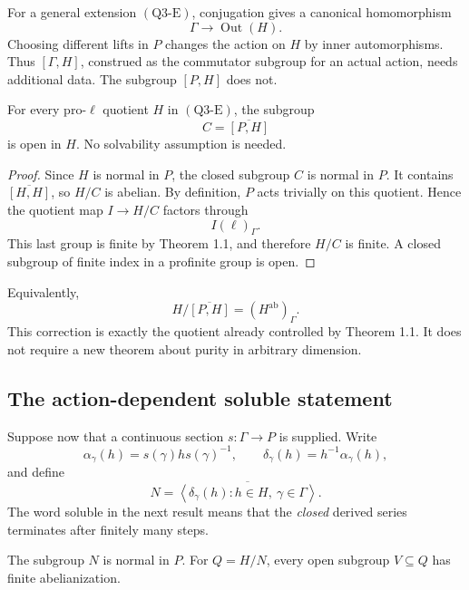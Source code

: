 For a general extension \((\mathrm{Q3\text{-}E})\), conjugation gives
a canonical homomorphism
\[
\Gamma\longrightarrow\operatorname{Out}(H).
\]
Choosing different lifts in \(P\) changes the action on \(H\) by
inner automorphisms.  Thus \([\Gamma,H]\), construed as the
commutator subgroup for an actual action, needs additional data.
The subgroup \([P,H]\) does not.

\begin{proposition}
\label{q3:canonical}
For every pro-\(\ell\) quotient \(H\) in
\((\mathrm{Q3\text{-}E})\), the subgroup
\[
C=\overline{[P,H]}
\]
is open in \(H\).  No solvability assumption is needed.
\end{proposition}

\begin{proof}
Since \(H\) is normal in \(P\), the closed subgroup \(C\) is normal
in \(P\).  It contains \(\overline{[H,H]}\), so \(H/C\) is abelian.
By definition, \(P\) acts trivially on this quotient.  Hence the
quotient map \(I\to H/C\) factors through
\[
I(\ell)_\Gamma.
\]
This last group is finite by Theorem 1.1, and therefore \(H/C\) is
finite.  A closed subgroup of finite index in a profinite group is
open.
\end{proof}

Equivalently,
\[
H/\overline{[P,H]}=(H^{\mathrm{ab}})_\Gamma.
\]
This correction is exactly the quotient already controlled by
Theorem 1.1.  It does not require a new theorem about purity in
arbitrary dimension.

\subsection{The action-dependent soluble statement}

Suppose now that a continuous section \(s:\Gamma\to P\) is supplied.
Write
\[
\alpha_\gamma(h)=s(\gamma)h s(\gamma)^{-1},\qquad
\delta_\gamma(h)=h^{-1}\alpha_\gamma(h),
\]
and define
\[
N=\overline{\left\langle
 \delta_\gamma(h):h\in H,\ \gamma\in\Gamma
\right\rangle}.
\]
The word soluble in the next result means that the \emph{closed}
derived series terminates after finitely many steps.

\begin{proposition}
\label{q3:fab}
The subgroup \(N\) is normal in \(P\).  For \(Q=H/N\), every open
subgroup \(V\subseteq Q\) has finite abelianization.
\end{proposition}

